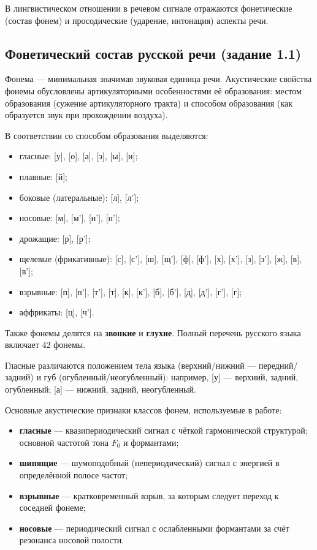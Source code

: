 В лингвистическом отношении в речевом сигнале отражаются фонетические
(состав фонем) и просодические (ударение, интонация) аспекты речи.

\subsection{Фонетический состав русской речи (задание 1.1)}

Фонема --- минимальная значимая звуковая единица речи. Акустические
свойства фонемы обусловлены артикуляторными особенностями её
образования: местом образования (сужение артикуляторного тракта) и
способом образования (как образуется звук при прохождении воздуха).

В соответствии со способом образования выделяются:
\begin{itemize}
	\item гласные: [у], [о], [а], [э], [ы], [и];
	\item плавные: [й];
	\item боковые (латеральные): [л], [л'];
	\item носовые: [м], [м'], [н'], [н'];
	\item дрожащие: [р], [р'];
	\item щелевые (фрикативные): [с], [с'], [ш], [щ'], [ф], [ф'], [х],
		[х'], [з], [з'], [ж], [в], [в'];
	\item взрывные: [п], [п'], [т'], [т], [к], [к'], [б], [б'], [д],
		[д'], [г'], [г];
	\item аффрикаты: [ц], [ч'].
\end{itemize}

Также фонемы делятся на \textbf{звонкие} и \textbf{глухие}. Полный
перечень русского языка включает 42 фонемы.

Гласные различаются положением тела языка (верхний/нижний ---
передний/задний) и губ (огубленный/неогубленный): например, [у] ---
верхний, задний, огубленный; [а] --- нижний, задний, неогубленный.

Основные акустические признаки классов фонем, используемые в работе:
\begin{itemize}
	\item \textbf{гласные} --- квазипериодический сигнал с чёткой
		гармонической структурой; основной частотой тона $F_0$ и формантами;
	\item \textbf{шипящие} --- шумоподобный (непериодический) сигнал с
		энергией в определённой полосе частот;
	\item \textbf{взрывные} --- кратковременный взрыв, за которым следует
		переход к соседней фонеме;
	\item \textbf{носовые} --- периодический сигнал с ослабленными
		формантами за счёт резонанса носовой полости.
\end{itemize}

